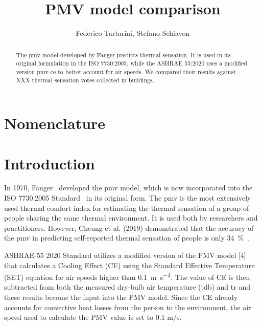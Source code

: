 \documentclass[11pt]{article}
\title{PMV model comparison}
\author{Federico Tartarini, Stefano Schiavon}
\begin{document}
    \maketitle

    \begin{abstract}
        The \ac{pmv} model developed by Fanger predicts thermal sensation.
        It is used in its original formulation in the ISO 7730:2005, while the ASHRAE 55:2020 uses a modified version \acs{pmv-ce} to better account for air speeds.
        We compared their results against XXX thermal sensation votes collected in buildings.
    \end{abstract}

    \section*{Nomenclature}
    

    \section{Introduction}\label{sec:introduction}
    In 1970, Fanger~\cite{Fanger1970} developed the \ac{pmv} model, which is now incorporated into the ISO 7730:2005 Standard~\cite{iso7730} in its original form.
    The \ac{pmv} is the most extensively used thermal comfort index for estimating the thermal sensation of a group of people sharing the same thermal environment.
    It is used both by researchers and practitioners.
    However, Cheung et al. (2019) demonstrated that the accuracy of the \ac{pmv} in predicting self-reported thermal sensation of people is only \qty{34}{\percent}~\cite{Cheung2019}.

    ASHRAE-55 2020 Standard utilizes a modified version of the PMV model [4] that calculates a Cooling Effect (CE) using the Standard Effective Temperature (SET) equation for air speeds higher than \qty{0.1}{\m\per\s}.
    The value of CE is then subtracted from both the measured dry-bulb air temperature (tdb) and \ac{tr} and these results become the input into the PMV model.
    Since the CE already accounts for convective heat losses from the person to the environment, the air speed used to calculate the PMV value is set to 0.1 m/s.

    \printbibliography
\end{document}
